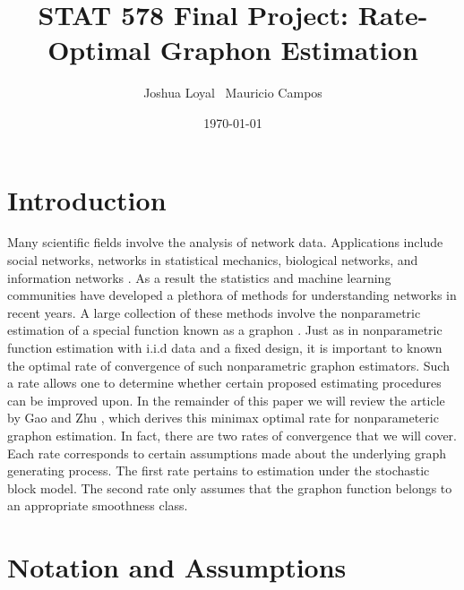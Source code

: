 \documentclass[11pt]{article}
\begin{document}
\title{  {\LARGE STAT 578 Final Project: Rate-Optimal Graphon Estimation} }

\author{
Joshua Loyal \,
Mauricio Campos
}

\date{\today}
\maketitle

\section{Introduction} \label{sec:intro}

Many scientific fields involve the analysis of network data. Applications include social networks, networks in statistical mechanics, biological networks, and information networks \citep{goldenberg2010survey}. As a result the statistics and machine learning communities have developed a plethora of methods for understanding networks in recent years. A large collection of these methods involve the nonparametric estimation of a special function known as a graphon \citep{borgs2008graphon, chatterjee2015univsvd, chan2014histo}. Just as in nonparametric function estimation with i.i.d data and a fixed design, it is important to known the optimal rate of convergence of such nonparametric graphon estimators. Such a rate allows one to determine whether certain proposed estimating procedures can be improved upon. In the remainder of this paper we will review the article by Gao and Zhu \citep{gao2015optgraphon}, which derives this minimax optimal rate for nonparameteric graphon estimation. In fact, there are two rates of convergence that we will cover. Each rate corresponds to certain assumptions made about the underlying graph generating process. The first rate pertains to estimation under the stochastic block model. The second rate only assumes that the graphon function belongs to an appropriate smoothness class.

\section{Notation and Assumptions} \label{sec:notation}
\end{document}
